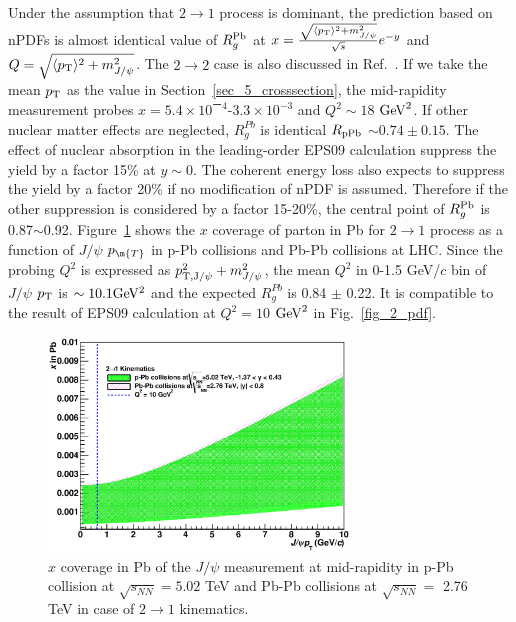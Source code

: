 Under the assumption that $2\rightarrow1$ process is dominant, the prediction based on nPDFs is almost identical value of $R_{g}^{\rm{Pb}}$ at $x= \frac{\sqrt{\langle p_{\rm{T}}\rangle^{2} +m_{J/\psi}^{2}}}{\sqrt{s}}e^{-y}$ and $Q=\sqrt{\langle p_{\rm{T}}\rangle^{2} + m_{J/\psi}^{2} }$. 
The $2\rightarrow 2$ case is also discussed in Ref.~\cite{bib_shadowf}.
If we take the mean $p_{\rm{T}}$ as the value in Section~\ref{sec_5_crosssection}, the mid-rapidity measurement probes $x=5.4\times 10^{ー4}$-$3.3\times10^{-3}$ and $Q^{2}\sim18$ $\rm{GeV}^{2}$. 
 If other nuclear matter effects are neglected, $R_{g}^{Pb}$ is identical $R_{\rm{pPb}}$ $\sim0.74 \pm 0.15$.  
 The effect of nuclear absorption in the leading-order EPS09 calculation suppress the yield by a factor 15\% at $y\sim0$. 
 The coherent energy loss also expects to suppress the yield by a factor 20\% if no modification of nPDF is assumed. 
Therefore if the other suppression is considered by a factor 15-20\%, the central point of $R_{g}^{\rm{Pb}}$ is 0.87$\sim$0.92.
Figure~\ref{fig_5_xcover} shows the $x$ coverage of parton in Pb for $2\rightarrow 1$ process as a function of $J/\psi$ $p_{\m{T}}$ in p-Pb collisions and Pb-Pb collisions at LHC. 
Since the probing $Q^{2}$ is expressed as $p_{\rm{T}, J/\psi}^{2} + m_{J/\psi}^{2}$, the mean $Q^{2}$ in 0-1.5 GeV/$c$ bin of $J/\psi$ $p_{\rm{T}}$ is $\sim 10.1 \rm{GeV^{2}}$ and the expected $R_{g}^{Pb}$ is 0.84 $\pm$ 0.22. 
It is compatible to the result of EPS09 calculation at $Q^{2}=10$ $\rm{GeV}^{2}$ in Fig.~\ref{fig_2_pdf}.
\begin{figure}[!h]
  \centering
  \includegraphics[width=8cm]{chap5/figure/xcover/xcoverageofjpsi.eps}
  \caption{$x$ coverage in Pb of the $J/\psi$ measurement at mid-rapidity in p-Pb collision at $\sqrt{s_{NN}}=5.02$ TeV and Pb-Pb collisions at $\sqrt{s_{NN}}=$ 2.76 TeV in case of $2\rightarrow1$ kinematics. }
  \label{fig_5_xcover}
\end{figure}


